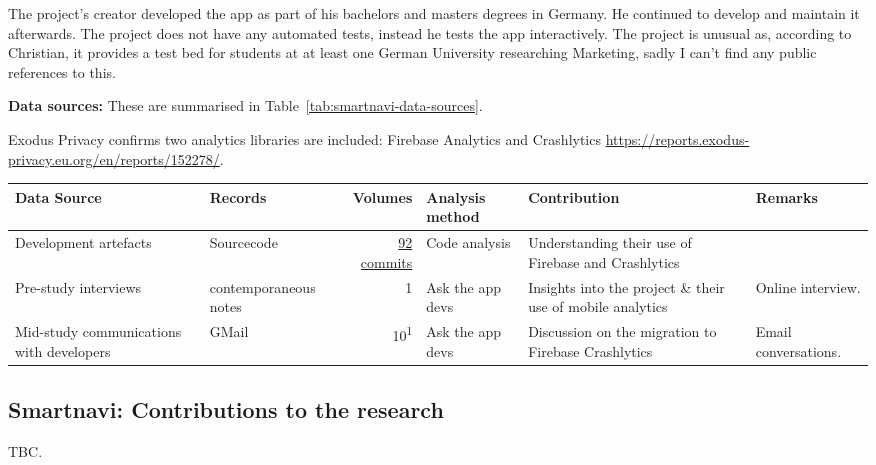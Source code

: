 The project's creator developed the app as part of his bachelors and masters degrees in Germany. He continued to develop and maintain it afterwards. The project does not have any automated tests, instead he tests the app interactively.  The project is unusual as, according to Christian, it provides a test bed for students at at least one German University researching Marketing, sadly I can't find any public references to this.

 \textbf{Data sources: } These are summarised in Table~\ref{tab:smartnavi-data-sources}.

Exodus Privacy confirms two analytics libraries are included: Firebase Analytics and Crashlytics \url{https://reports.exodus-privacy.eu.org/en/reports/152278/}.


\begin{table*}
    \centering
    \footnotesize
    \tabcolsep=0.12cm
    \begin{tabular}{>{\raggedright}p{3cm}p{2.4cm}r>{\raggedright}p{2.1cm}>{\raggedright\arraybackslash}p{3cm}>{\raggedright\arraybackslash}p{2.2cm}}
        Data Source & Records & Volumes & Analysis method & Contribution & Remarks \\
        \toprule
        Development artefacts & Sourcecode\footnotemark & \href{https://github.com/Phantast/smartnavi/commits/master}{92 commits} & Code analysis & Understanding their use of Firebase and Crashlytics & \\
         Pre-study interviews & contemporaneous notes & 1 & Ask the app devs & Insights into the project \& their use of mobile analytics & Online interview. \\
         Mid-study communications with developers & GMail & 10\textsuperscript{1} & Ask the app devs & Discussion on the migration to Firebase Crashlytics & Email conversations. \\
         \bottomrule
    \end{tabular}
    \caption{Smartnavi: data sources}
    \label{tab:smartnavi-data-sources}
\end{table*}


\subsection{Smartnavi: Contributions to the research}
TBC.



